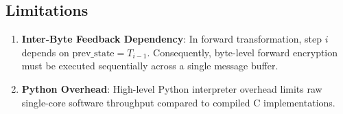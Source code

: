 \subsection{Limitations}
\label{subsec:limitations}
\begin{enumerate}
    \item \textbf{Inter-Byte Feedback Dependency}: In forward transformation, step $i$ depends on $\text{prev\_state} = T_{i-1}$. Consequently, byte-level forward encryption must be executed sequentially across a single message buffer.
    \item \textbf{Python Overhead}: High-level Python interpreter overhead limits raw single-core software throughput compared to compiled C implementations.
\end{enumerate}

